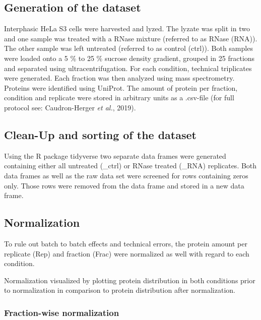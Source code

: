 \documentclass[
]{article}
\begin{document}
\hypertarget{generation-of-the-dataset}{%
\subsection{Generation of the dataset}\label{generation-of-the-dataset}}

Interphasic HeLa S3 cells were harvested and lyzed. The lyzate was split
in two and one sample was treated with a RNase mixture (referred to as
RNase (RNA)). The other sample was left untreated (referred to as
control (ctrl)). Both samples were loaded onto a 5 \% to 25 \% sucrose
density gradient, grouped in 25 fractions and separated using
ultracentrifugation. For each condition, technical triplicates were
generated. Each fraction was then analyzed using mass spectrometry.
Proteins were identified using UniProt. The amount of protein per
fraction, condition and replicate were stored in arbitrary units as a
.csv-file (for full protocol see: Caudron-Herger \emph{et al.}, 2019).

\hypertarget{clean-up-and-sorting-of-the-dataset}{%
\subsection{Clean-Up and sorting of the
dataset}\label{clean-up-and-sorting-of-the-dataset}}

Using the R package tidyverse two separate data frames were generated
containing either all untreated (\_ctrl) or RNase treated (\_RNA)
replicates. Both data frames as well as the raw data set were screened
for rows containing zeros only. Those rows were removed from the data
frame and stored in a new data frame.

\hypertarget{normalization}{%
\subsection{Normalization}\label{normalization}}

To rule out batch to batch effects and technical errors, the protein
amount per replicate (Rep) and fraction (Frac) were normalized as well
with regard to each condition.

Normalization visualized by plotting protein distribution in both
conditions prior to normalization in comparison to protein distribution
after normalization.

\hypertarget{fraction-wise-normalization}{%
\subsubsection{Fraction-wise
normalization}\label{fraction-wise-normalization}}
\end{document}
